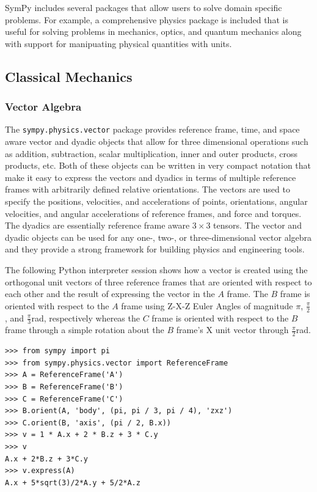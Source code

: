 SymPy includes several packages that allow users to solve domain specific
problems. For example, a comprehensive physics package is included that is
useful for solving problems in mechanics, optics, and quantum
mechanics along with support for manipuating physical quantities with units.


\subsection{Classical Mechanics}

\subsubsection{Vector Algebra}

The \verb|sympy.physics.vector| package provides reference frame, time, and
space aware vector and dyadic objects that allow for three dimensional
operations such as addition, subtraction, scalar multiplication, inner and
outer products, cross products, etc. Both of these objects can be written in
very compact notation that make it easy to express the vectors and dyadics in
terms of multiple reference frames with arbitrarily defined relative
orientations. The vectors are used to specify the positions, velocities, and
accelerations of points, orientations, angular velocities, and angular
accelerations of reference frames, and force and torques. The dyadics are
essentially reference frame aware $3 \times 3$ tensors. The vector and dyadic
objects can be used for any one-, two-, or three-dimensional vector algebra and
they provide a strong framework for building physics and engineering tools.

The following Python interpreter session shows how a vector is created using
the orthogonal unit vectors of three reference frames that are oriented with
respect to each other and the result of expressing the vector in the $A$
frame. The $B$ frame is oriented with respect to the $A$ frame using Z-X-Z
Euler Angles of magnitude $\pi$, $\frac{\pi}{2}$, and
$\frac{\pi}{3}$\si{\radian}, respectively whereas the $C$ frame is oriented
with respect to the $B$ frame through a simple rotation about the $B$ frame's
X unit vector through $\frac{\pi}{2}$\si{\radian}.

\begin{verbatim}
>>> from sympy import pi
>>> from sympy.physics.vector import ReferenceFrame
>>> A = ReferenceFrame('A')
>>> B = ReferenceFrame('B')
>>> C = ReferenceFrame('C')
>>> B.orient(A, 'body', (pi, pi / 3, pi / 4), 'zxz')
>>> C.orient(B, 'axis', (pi / 2, B.x))
>>> v = 1 * A.x + 2 * B.z + 3 * C.y
>>> v
A.x + 2*B.z + 3*C.y
>>> v.express(A)
A.x + 5*sqrt(3)/2*A.y + 5/2*A.z
\end{verbatim}

